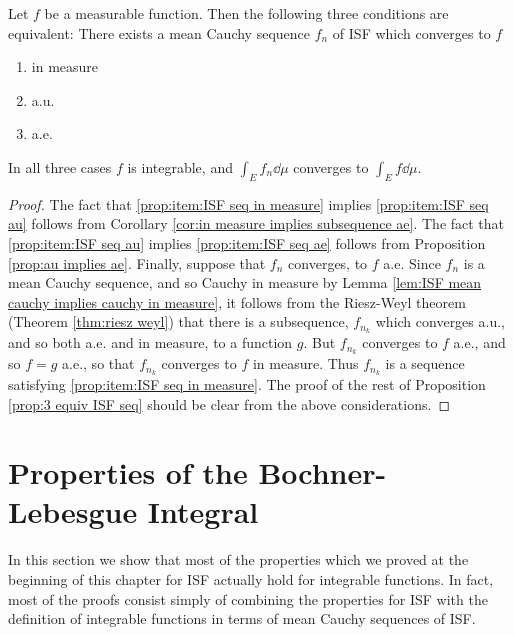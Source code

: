 \begin{proposition}
\label{prop:3 equiv ISF seq}
Let $f$ be a measurable function. Then the following three conditions are equivalent: There exists a mean Cauchy sequence $f_n$ of ISF which converges to $f$
\begin{enumerate}[label=\arabic*),ref=\arabic*)]
    \item \label{prop:item:ISF seq in measure}
    in measure
    \item \label{prop:item:ISF seq au}
    a.u.
    \item \label{prop:item:ISF seq ae}
    a.e.
\end{enumerate}
In all three cases $f$ is integrable, and $\int_Ef_n\dd\mu$ converges to $\int_Ef\dd\mu$.
\end{proposition}

\begin{proof}
The fact that \ref{prop:item:ISF seq in measure} implies \ref{prop:item:ISF seq au} follows from Corollary \ref{cor:in measure implies subsequence ae}. The fact that \ref{prop:item:ISF seq au} implies \ref{prop:item:ISF seq ae} follows from Proposition \ref{prop:au implies ae}. Finally, suppose that $f_n$ converges, to $f$ a.e. Since $f_n$ is a mean Cauchy sequence, and so Cauchy in measure by Lemma \ref{lem:ISF mean cauchy implies cauchy in measure}, it follows from the Riesz-Weyl theorem (Theorem \ref{thm:riesz weyl}) that there is a subsequence, $f_{n_k}$ which converges a.u., and so both a.e. and in measure, to a function $g$. But $f_{n_k}$ converges to $f$ a.e., and so $f=g$ a.e., so that $f_{n_k}$ converges to $f$ in measure. Thus $f_{n_k}$ is a sequence satisfying \ref{prop:item:ISF seq in measure}. The proof of the rest of Proposition \ref{prop:3 equiv ISF seq} should be clear from the above considerations.
\end{proof}

\section{Properties of the Bochner-Lebesgue Integral}

In this section we show that most of the properties which we proved at the beginning of this chapter for ISF actually hold for integrable functions. In fact, most of the proofs consist simply of combining the properties for ISF with the definition of integrable functions in terms of mean Cauchy sequences of ISF.

